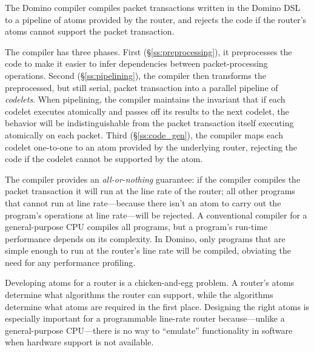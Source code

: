  The Domino compiler compiles packet transactions written
in the Domino DSL to a pipeline of atoms provided by the router, and rejects
the code if the router's atoms cannot support the packet transaction.

The compiler has three phases. First (\S\ref{ss:preprocessing}), it
preprocesses the code to make it easier to infer dependencies between
packet-processing operations. Second (\S\ref{ss:pipelining}), the compiler then
transforms the preprocessed, but still serial, packet transaction into a
parallel pipeline of {\em codelets}. When pipelining, the compiler maintains
the invariant that if each codelet executes atomically and passes off its
results to the next codelet, the behavior will be indistinguishable from the
packet transaction itself executing atomically on each packet. Third
(\S\ref{ss:code_gen}), the compiler maps each codelet one-to-one to an atom
provided by the underlying router, rejecting the code if the codelet cannot be
supported by the atom.

The compiler provides an {\em all-or-nothing} guarantee: if the compiler
compiles the packet transaction it will run at the line rate of the router; all
other programs that cannot run at line rate---because there isn't an atom to
carry out the program's operations at line rate---will be rejected. A
conventional compiler for a general-purpose CPU compiles all programs, but a
program's run-time performance depends on its complexity. In Domino, only
programs that are simple enough to run at the router's line rate will be
compiled, obviating the need for any performance profiling.

Developing atoms for a router is a chicken-and-egg problem. A router's atoms
determine what algorithms the router can support, while the algorithms
determine what atoms are required in the first place. Designing the right atoms
is especially important for a programmable line-rate router because---unlike a
general-purpose CPU---there is no way to ``emulate'' functionality in software
when hardware support is not available.

